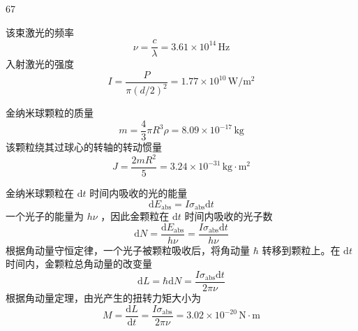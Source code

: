 \begin{solution}{67}
    \begin{subsolution}
        该束激光的频率
        \begin{equation}
            \nu = \frac{c}{\lambda} = 3.61 \times 10^{14}\,\mathrm{Hz} \label{eq:1.p67}
        \end{equation}
        入射激光的强度
        \begin{equation}
            I = \frac{P}{\pi (d/2)^{2}} = 1.77 \times 10^{10}\,\mathrm{W/m^{2}} \label{eq:2.p67}
        \end{equation}
    \end{subsolution}
    \begin{subsolution}
        金纳米球颗粒的质量
        \begin{equation}
            m = \frac{4}{3}\pi R^{3}\rho = 8.09 \times 10^{-17}\,\mathrm{kg} \label{eq:3.p67}
        \end{equation}
        该颗粒绕其过球心的转轴的转动惯量
        \begin{equation}
            J = \frac{2mR^{2}}{5} = 3.24 \times 10^{-31}\,\mathrm{kg\cdot m^{2}} \label{eq:4.p67}
        \end{equation}
    \end{subsolution}
    \begin{subsolution}
        金纳米球颗粒在 $\mathrm{d}t$ 时间内吸收的光的能量
        \begin{equation}
            \mathrm{d}E_{\mathrm{abs}} = I \sigma_{\mathrm{abs}} \mathrm{d}t \label{eq:5.p67}
        \end{equation}
        一个光子的能量为 $h\nu$ ，因此金颗粒在 $\mathrm{d}t$ 时间内吸收的光子数
        \begin{equation}
            \mathrm{d}N = \frac{\mathrm{d}E_{\mathrm{abs}}}{h\nu} = \frac{I\sigma_{\mathrm{abs}}\mathrm{d}t}{h\nu} \label{eq:6.p67}
        \end{equation}
        根据角动量守恒定律，一个光子被颗粒吸收后，将角动量 $\hbar$ 转移到颗粒上。在 $\mathrm{d}t$ 时间内，金颗粒总角动量的改变量
        \begin{equation}
            \mathrm{d}L = \hbar \mathrm{d}N = \frac{I\sigma_{\mathrm{abs}}\mathrm{d}t}{2\pi\nu} \label{eq:7.p67}
        \end{equation}
        根据角动量定理，由光产生的扭转力矩大小为
        \begin{equation}
            M = \frac{\mathrm{d}L}{\mathrm{d}t} = \frac{I\sigma_{\mathrm{abs}}}{2\pi\nu} = 3.02 \times 10^{-20}\,\mathrm{N\cdot m} \label{eq:8.p67}

\end{equation}
\end{subsolution}
\end{solution}
